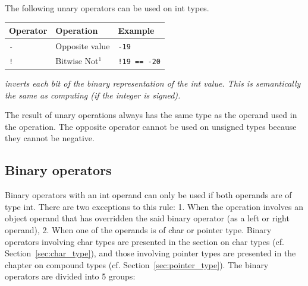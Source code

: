 The following unary operators can be used on int types.



\begin{center}
  \begin{threeparttable}
    \begin{tabular}{|l|ll|}
      \hline
      Operator & Operation & Example\\[0pt]
      \hline
      \hline
      \texttt{-} & Opposite value & \texttt{-19}\\[0pt]
      \hline
      \texttt{!} & Bitwise Not\(^{1}\) & \texttt{!19 == -20}\\[0pt]
      \hline
    \end{tabular}
    \begin{tablenotes}

    \item[1.] \footnotesize \textit{inverts each bit of the binary
      representation of the int value. This is semantically the same as
      computing  (if the integer is signed).}

    \end{tablenotes}
  \end{threeparttable}
\end{center}

The result of unary operations always has the same type as the operand used in
the operation. The opposite operator \token{-} cannot be used on unsigned types
because they cannot be negative.

\subsection{Binary operators}
\label{sec:orgb91194f}

Binary operators with an int operand can only be used if both operands are of
type int. There are two exceptions to this rule: 1. When the operation involves
an object operand that has overridden the said binary operator (as a left or
right operand), 2. When one of the operands is of char or pointer type. Binary
operators involving char types are presented in the section on char types (cf.
Section~\ref{sec:char_type}), and those involving pointer types are presented in
the chapter on compound types (cf. Section~\ref{sec:pointer_type}). The binary
operators are divided into 5 groups:

